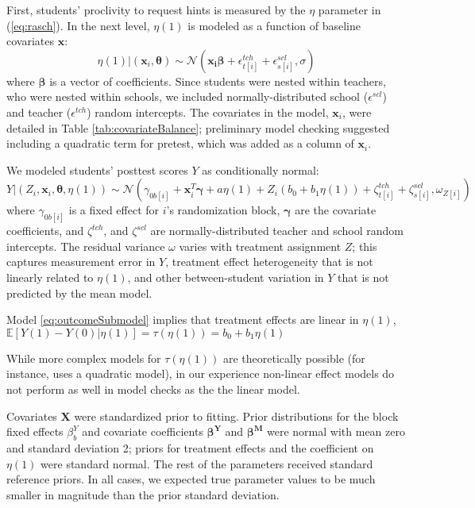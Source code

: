 \documentclass{article}\usepackage[]{graphicx}\usepackage[]{color}
\newcommand{\EE}{\mathbb{E}}
\begin{document}
First, students' proclivity to request hints is measured by the $\eta$
parameter in (\ref{eq:rasch}).
In the next level, $\eta(1)$ is modeled as a function of baseline
covariates $\bm{x}$:
\begin{equation}\label{eq:rasch2}
\eta(1)|\left(\bm{x}_i,\bm{\theta}\right) \sim
\mathcal{N}\left(\bm{x_i}\bm{\beta}+\epsilon^{tch}_{t[i]}+\epsilon^{scl}_{s[i]},
\sigma\right)
\end{equation}
where $\bm{\beta}$ is a vector of coefficients.
Since students were nested within teachers, who were nested within
schools, we included normally-distributed school ($\epsilon^{scl}$) and
teacher ($\epsilon^{tch}$) random intercepts.
The covariates in the model, $\bm{x}_i$, were detailed in Table
\ref{tab:covariateBalance}; preliminary model checking suggested
including a quadratic term for pretest, which was added as a column of
$\bm{x}_i$.

We modeled students' posttest scores $Y$ as
conditionally normal:
\begin{equation}\label{eq:outcomeSubmodel}
 Y|\left(Z_i,\bm{x}_i,\bm{\theta},\eta(1)\right) \sim  \mathcal{N}\left(
\gamma_{0b[i]}+\bm{x}_i^T\bm{\gamma}+a\eta(1)+Z_i(b_0+b_1\eta(1))+\zeta^{tch}_{t[i]}+\zeta^{scl}_{s[i]},\omega_{Z[i]}\right)
\end{equation}
where $\gamma_{0b[i]}$ is a fixed effect for $i$'s randomization block, $\bm{\gamma}$ are the
covariate coefficients, and $\zeta^{tch}$, and
$\zeta^{scl}$ are normally-distributed teacher and school random
intercepts.
The residual variance $\omega$ varies with treatment assignment $Z$;
this captures measurement error in $Y$, treatment effect heterogeneity
that is not linearly related to
$\eta(1)$, and other between-student variation in $Y$ that is not predicted by
the mean model.

Model \eqref{eq:outcomeSubmodel} implies that treatment effects are
linear in $\eta(1)$,
$\EE[Y(1)-Y(0)|\eta(1)]=\tau({\eta(1)})=b_0+b_1\eta(1)$

While more complex models for $\tau(\eta(1))$ are theoretically
possible (for instance, \citet{jin2008principal} uses a quadratic
model), in our experience non-linear effect models do not perform as
well in model checks as the the linear model.

Covariates $\bm{X}$ were standardized prior to fitting.
Prior distributions for the block fixed effects $\beta^Y_b$ and covariate coefficients
$\bm{\beta^Y}$ and $\bm{\beta^M}$ were normal with mean zero and
standard deviation 2;
priors for treatment effects and the coefficient on $\eta(1)$ were standard
normal.
The rest of the parameters received standard reference priors.
In all cases, we expected true parameter values to be much smaller in
magnitude than the prior standard deviation.
\end{document}
